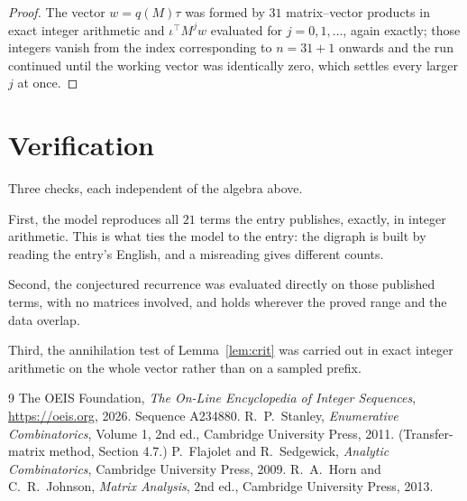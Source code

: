 \documentclass[11pt,a4paper]{article}
\theoremstyle{plain}
\theoremstyle{definition}
\begin{document}
\begin{proof}
The vector $w=q(M)\tau$ was formed by $31$ matrix--vector products in exact integer
arithmetic and $\iota^{\!\top}M^{j}w$ evaluated for $j=0,1,\dots$, again exactly; those
integers vanish from the index corresponding to $n=31+1$ onwards and the run continued
until the working vector was identically zero, which settles every larger $j$ at once.
\end{proof}

\section{Verification}

Three checks, each independent of the algebra above.

First, the model reproduces all $21$ terms the entry publishes, exactly, in integer
arithmetic. This is what ties the model to the entry: the digraph is built by reading the
entry's English, and a misreading gives different counts.

Second, the conjectured recurrence was evaluated directly on those published terms, with no
matrices involved, and holds wherever the proved range and the data overlap.

Third, the annihilation test of Lemma~\ref{lem:crit} was carried out in exact integer
arithmetic on the whole vector rather than on a sampled prefix.

\begin{thebibliography}{9}
 The OEIS Foundation, \emph{The On-Line Encyclopedia of Integer
Sequences}, \url{https://oeis.org}, 2026. Sequence A234880.
 R.~P.~Stanley, \emph{Enumerative Combinatorics}, Volume 1, 2nd ed.,
Cambridge University Press, 2011. (Transfer-matrix method, Section 4.7.)
 P.~Flajolet and R.~Sedgewick, \emph{Analytic Combinatorics}, Cambridge
University Press, 2009.
 R.~A.~Horn and C.~R.~Johnson, \emph{Matrix Analysis}, 2nd ed., Cambridge
University Press, 2013.
\end{thebibliography}
\end{document}
